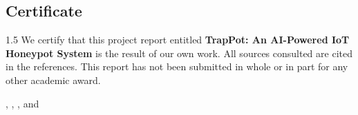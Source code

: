 \begin{center}
\section*{Certificate}
\end{center}

\begin{spacing}{1.5}
We certify that this project report entitled \textbf{TrapPot: An AI-Powered IoT Honeypot System} is the result of our own work. All sources consulted are cited in the references. This report has not been submitted in whole or in part for any other academic award.
\end{spacing}

\begin{flushright}
{\firststudentname}, {\secondstudentname}, {\thirdstudentname}, and {\fourthstudentname}
\end{flushright}
\clearpage
